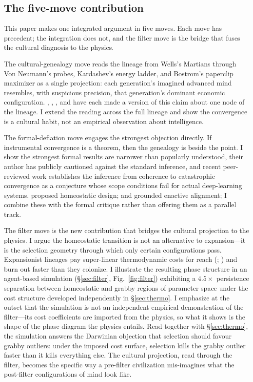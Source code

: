 \documentclass[11pt,a4paper,twocolumn]{article}
\begin{document}
\subsection{The five-move contribution}

This paper makes one integrated argument in five moves. Each move has
precedent; the integration does not, and the filter move is the bridge
that fuses the cultural diagnosis to the physics.

The cultural-genealogy move reads the lineage from Wells's Martians
through Von Neumann's probes, Kardashev's energy ladder, and Bostrom's
paperclip maximizer as a single projection: each generation's imagined
advanced mind resembles, with suspicious precision, that generation's
dominant economic configuration. \citet{rieder2008}, \citet{mirowski2002},
\citet{cirkovic2015}, and \citet{gebru2024} have each made a version
of this claim about one node of the lineage. I extend the reading
across the full lineage and show the convergence is a cultural habit,
not an empirical observation about intelligence.

The formal-deflation move engages the strongest objection directly. If
instrumental convergence is a theorem, then the genealogy is beside
the point. I show the strongest formal results
\citep{turner2021,turner2022} are narrower than popularly understood,
their author has publicly cautioned against the standard inference,
and recent peer-reviewed work \citep{gallow2024,sharadin2025,muller2022}
establishes the inference from coherence to catastrophic convergence
as a conjecture whose scope conditions fail for actual deep-learning
systems. \citet{man2019} proposed homeostatic design; \citet{froese2009}
and \citet{cannon2022} grounded enactive alignment; I combine these
with the formal critique rather than offering them as a parallel
track.

The filter move is the new contribution that bridges the cultural
projection to the physics. I argue the homeostatic transition is not
an alternative to expansion---it is the selection geometry through
which only certain configurations pass. Expansionist lineages pay
super-linear thermodynamic costs for reach (\citealp{boyd2022};
\citealp{wong2022}) and burn out faster than they colonize. I
illustrate the resulting phase structure in an agent-based simulation
(\S\ref{sec:filter}, Fig.~\ref{fig:filter}) exhibiting a
$4.5\times$ persistence separation between homeostatic and grabby
regions of parameter space under the cost structure developed
independently in \S\ref{sec:thermo}. I emphasize at the outset that
the simulation is not an independent empirical demonstration of the
filter---its cost coefficients are imported from the physics, so what
it shows is the shape of the phase diagram the physics entails. Read
together with \S\ref{sec:thermo}, the simulation answers the Darwinian
objection that selection should favour grabby outliers: under the
imposed cost surface, selection kills the grabby outlier faster than
it kills everything else. The cultural projection, read through the
filter, becomes the specific way a pre-filter civilization
mis-imagines what the post-filter configurations of mind look like.
\end{document}
